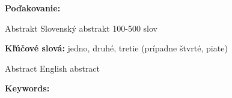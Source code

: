 \documentclass[12pt, oneside]{book}
\begin{document}
\vfill
{\bf Poďakovanie:}


\newpage 
\thispagestyle{empty}

\huge{Abstrakt}
\normalsize
\newline
Slovenský abstrakt 100-500 slov

{\bf Kľúčové slová:} jedno, druhé, tretie (prípadne štvrté, piate)


\newpage 
\thispagestyle{empty}

\huge{Abstract}
\normalsize
\newline
English abstract

{\bf Keywords:} 


%
%



\newpage 

\tableofcontents



\newpage 

\listoffigures


\mainmatter


 











\end{document}
